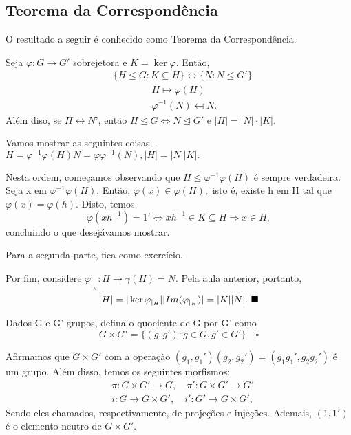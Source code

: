 \documentclass[Algebra/algebra_notes.tex]{subfiles}
\begin{document}
\subsection{Teorema da Correspondência}
O resultado a seguir é conhecido como Teorema da Correspondência.
\begin{theorem*}
	Seja $\varphi:G\rightarrow G'$ sobrejetora e $K=\ker{\varphi}.$ Então,
	\begin{align*}
		 & \{H\leq{G}: K \subseteq{H}\} \longleftrightarrow \{N: N\leq{G'}\} \\
		 & \quad\quad\quad\quad H\mapsto \varphi(H)                          \\
		 & \quad\quad\quad\quad \varphi^{-1}(N)\mapsfrom N.
	\end{align*}
	Além diso, se $H\leftrightarrow N$', então $H\trianglelefteq{G} \Longleftrightarrow N\trianglelefteq{G'}$ e
	$|H| = |N|\cdot|K|.$
\end{theorem*}
\begin{proof*}
	Vamos mostrar as seguintes coisas - $H = \varphi^{-1}\varphi(H) N = \varphi \varphi^{-1}(N), |H|=|N||K|.$

	Nesta ordem, começamos observando que $H\leq{\varphi^{-1}\varphi(H)}$ é sempre verdadeira. Seja x em $\varphi^{-1}\varphi(H).$
	Então, $\varphi(x)\in\varphi(H),$ isto é, existe h em H tal que $\varphi(x) = \varphi(h)$. Disto, temos
	$$
		\varphi(xh^{-1}) = 1' \Longleftrightarrow xh^{-1}\in K\subseteq{H} \Rightarrow x\in H,
	$$
	concluindo o que desejávamos mostrar.

	Para a segunda parte, fica como exercício.

	Por fim, considere $\varphi_{|_{H}}:H\rightarrow \gamma(H) = N$. Pela aula anterior, portanto,
	$$
		|H| = |\ker{\varphi_{|_{H}}}||Im(\varphi_{|_{H}})| = |K||N|.\text{ $\blacksquare$}
	$$
\end{proof*}
\begin{def*}
	Dados G e G' grupos, defina o quociente de G por G' como
	$$
		G\times{G'} = \{(g, g'): g\in G, g'\in G'\}\quad\square
	$$
\end{def*}
Afirmamos que $G\times{G'}$ com a operação $(g_{1}, g_{1}')(g_{2}, g_{2}') = (g_{1}g_{1}', g_{2}g_{2}')$ é um grupo.
Além disso, temos os seguintes morfismos:
\begin{align*}
	 & \pi:G\times{G'}\rightarrow G,\quad \pi':G\times{G'}\rightarrow G' \\
	 & i:G\rightarrow G\times{G'},\quad i':G'\rightarrow G\times{G'},
\end{align*}
Sendo eles chamados, respectivamente, de projeções e injeções. Ademais, $(1, 1')$ é o elemento neutro de $G\times{G'}.$
\end{document}

